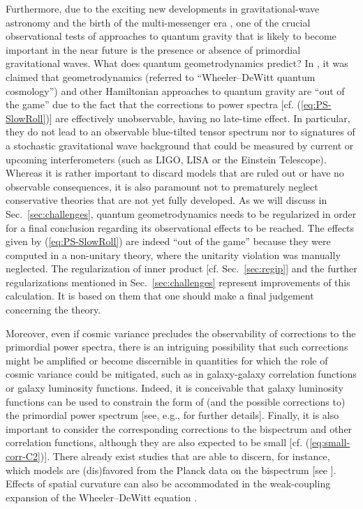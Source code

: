 \documentclass[12pt]{iopart}
\def\eref#1{(\ref{eq:#1})}
\begin{document}
Furthermore, due to the exciting new developments in gravitational-wave astronomy and the birth of the multi-messenger era \citep{Addazi:2021xuf,Calcagni:2022ssd}, one of the crucial observational tests of approaches to quantum gravity that is likely to become important in the near future is the presence or absence of primordial gravitational waves. What does quantum geometrodynamics predict? In \citet{Calcagni:2020tvw}, it was claimed that geometrodynamics (referred to ``Wheeler--DeWitt quantum cosmology'') and other Hamiltonian approaches to quantum gravity are ``out of the game'' due to the fact that the corrections to power spectra [cf. \eref{PS-SlowRoll}] are effectively unobservable, having no late-time effect. In particular, they do not lead to an observable blue-tilted tensor spectrum nor to signatures of a stochastic gravitational wave background that could be measured by current or upcoming interferometers (such as LIGO, LISA or the Einstein Telescope). Whereas it is rather important to discard models that are ruled out or have no observable consequences, it is also paramount not to prematurely neglect conservative theories that are not yet fully developed. As we will discuss in Sec.~\ref{sec:challenges}, quantum geometrodynamics needs to be regularized in order for a final conclusion regarding its observational effects to be reached. The effects given by \eref{PS-SlowRoll} are indeed ``out of the game'' because they were computed in a non-unitary theory, where the unitarity violation was manually neglected. The regularization of inner product [cf. Sec.~\ref{sec:regip}] and the further regularizations mentioned in Sec.~\ref{sec:challenges} represent improvements of this calculation. It is based on them that one should make a final judgement concerning the theory.

Moreover, even if cosmic variance precludes the observability of corrections to the primordial power spectra, there is an intriguing possibility that such corrections might be amplified or become discernible in quantities for which the role of cosmic variance could be mitigated, such as in galaxy-galaxy correlation functions or galaxy luminosity functions. Indeed, it is conceivable that galaxy luminosity functions can be used to constrain the form of (and the possible corrections to) the primordial power spectrum [see, e.g., \citet{Yoshiura:2020soa} for further details]. Finally, it is also important to consider the corresponding corrections to the bispectrum and other correlation functions, although they are also expected to be small [cf. \eref{small-corr-C2}]. There already exist studies that are able to discern, for instance, which models are (dis)favored from the Planck data on the bispectrum [see \citet{vanTent:2022vgy}]. Effects of spatial curvature can also be accommodated in the weak-coupling expansion of the Wheeler--DeWitt equation \citep{HalliwellHawking,Kiefer:2021iko}.
\end{document}
